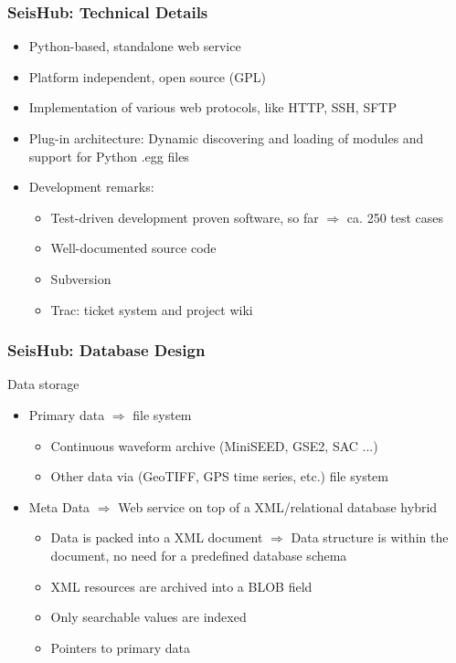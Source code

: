 \documentclass[t,10pt,compress=false,usepdftitle=false]{beamer}
\begin{document}
\begin{frame}[fragile]
    \frametitle{SeisHub: Technical Details}
    \begin{itemize}
        \item Python-based, standalone web service
        \item Platform independent, open source (GPL)
        \item Implementation of various web protocols, like HTTP, SSH, SFTP
        \item Plug-in architecture: Dynamic discovering and loading of modules and support for Python .egg files
        \item Development remarks:
        \begin{itemize}
            \item Test-driven development proven software, so far $\Rightarrow$ ca. 250 test cases
            \item Well-documented source code
            \item Subversion
            \item Trac: ticket system and project wiki
        \end{itemize}
    \end{itemize}
\end{frame}

\begin{frame}[fragile]
    \frametitle{SeisHub: Database Design}
    Data storage
    \begin{itemize}
        \item Primary data $\Rightarrow$ file system
        \begin{itemize}
            \item Continuous waveform archive (MiniSEED, GSE2, SAC ...)
            \item Other data via (GeoTIFF, GPS time series, etc.) file system
        \end{itemize}
        \item Meta Data $\Rightarrow$ Web service on top of a XML/relational database hybrid
        \begin{itemize}
            \item Data is packed into a XML document $\Rightarrow$ Data structure is within the document, no need for a predefined database schema
            \item XML resources are archived into a BLOB field
            \item Only searchable values are indexed
            \item Pointers to primary data
        \end{itemize}
    \end{itemize}
\end{frame}
\end{document}
